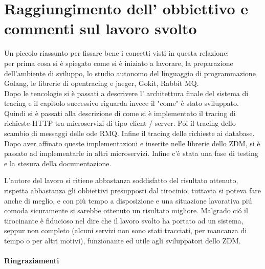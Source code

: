 \documentclass[a4paper,12pt,titlepage,italian,openany]{report}
\begin{document}
\section{Raggiungimento dell' obbiettivo e commenti sul lavoro svolto}
Un piccolo riassunto per fissare bene i concetti visti in questa relazione:\\
per prima cosa si è spiegato come si è iniziato a lavorare, la preparazione dell'ambiente di sviluppo, lo studio autonomo del linguaggio di programmazione 
Golang, le librerie di opentracing e jaeger, Gokit, Rabbit MQ. \\
Dopo le tencologie si è passati a descrivere l' architettura finale del sistema di tracing e il capitolo successivo riguarda invece il "come" è stato sviluppato. 
Quindi si è passati alla descrizione di come si è implementato il tracing
di richieste HTTP tra microservizi di tipo client / server. Poi il tracing dello scambio di messaggi delle ode RMQ. Infine  il tracing delle richieste ai database.
Dopo aver affinato queste implementazioni e inserite nelle librerie dello ZDM\cite{zdm:1}, si è passato ad implementarle in altri microservizi. Infine c'è stata una fase di testing e la stesura della documentazione.

L'autore del lavoro si ritiene abbastanza soddisfatto del risultato ottenuto, rispetta abbastanza gli obbiettivi presupposti dal tirocinio; tuttavia si poteva fare anche di meglio, e con più tempo a disposizione e una situazione lavorativa piú comoda sicuramente si sarebbe ottenuto un risultato migliore. 
Malgrado ció il tirocinante è fiducioso nel dire che il lavoro svolto ha portato ad un sistema, seppur non completo (alcuni servizi non sono stati tracciati, per mancanza di tempo o per altri motivi), funzionante ed utile agli sviluppatori dello ZDM\cite{zdm:1}.


\appendix



 
\paragraph{Ringraziamenti}
\end{document}
